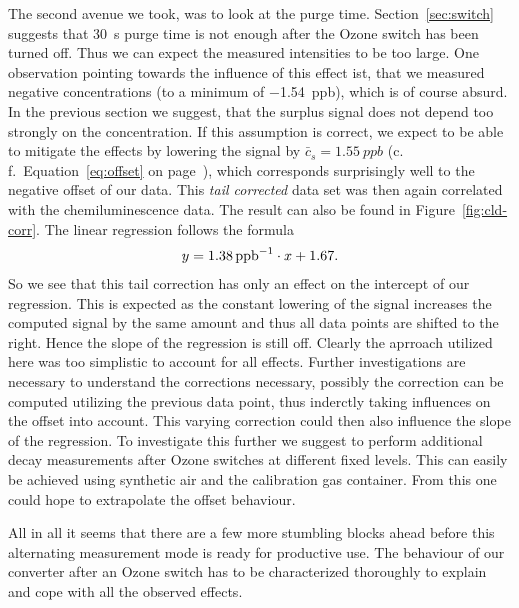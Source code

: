 The second avenue we took, was to look at the purge time.
Section~\ref{sec:switch} suggests that \SI{30}{\second} purge time is
not enough after the Ozone switch has been turned off. Thus we can
expect the measured  intensities to be too large. One
observation pointing towards the influence of this effect ist, that we
measured negative  concentrations (to a minimum of
\SI{-1.54}{ppb}), which is of course absurd. In the previous section
we suggest, that the surplus  signal does not depend too
strongly on the  concentration. If this assumption is correct,
we expect to be able to mitigate the effects by lowering the 
signal by $\bar c_s = \SI{1.55}{ppb}$ (c.\,f.\
Equation~\eqref{eq:offset} on page~\pageref{eq:offset}), which
corresponds surprisingly well to the negative offset of our data. This
\emph{tail corrected} data set was then again correlated with the
chemiluminescence data. The result can also be found in
Figure~\ref{fig:cld-corr}. The linear regression follows the formula
\begin{align*}
  y = \SI{1.38}{ppb\tothe{-1}} \cdot x + 1.67.
\end{align*}
So we see that this tail correction has only an effect on the
intercept of our regression. This is expected as the constant lowering
of the \ch{NO2} signal increases the computed \ch{NO} signal by the
same amount and thus all data points are shifted to the
right. Hence the slope of the regression is still off. Clearly the
aprroach utilized here was too simplistic to account for all
effects. Further investigations are necessary to understand the
corrections necessary, possibly the  correction can be
computed utilizing the previous  data point, thus inderctly
taking \ch{NO} influences on the offset into account. This varying 
correction could then also influence the slope of the
regression. To investigate this further we suggest to perform
additional decay measurements after Ozone switches at different fixed
\ch{NO} levels. This can easily be achieved using synthetic air and
the calibration gas container. From this one could hope to extrapolate
the offset behaviour.

All in all it seems that there are a few more stumbling blocks ahead
before this alternating measurement mode is ready for productive
use. The behaviour of our converter after an Ozone switch has to be
characterized thoroughly to explain and cope with all the observed
effects.

